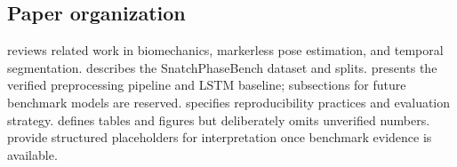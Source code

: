 \subsection{Paper organization}

 reviews related work in biomechanics, markerless pose estimation, and temporal segmentation.
 describes the SnatchPhaseBench dataset and splits.
 presents the verified preprocessing pipeline and \acs{LSTM} baseline; subsections for future benchmark models are reserved.
 specifies reproducibility practices and evaluation strategy.
 defines tables and figures but deliberately omits unverified numbers.
 provide structured placeholders for interpretation once benchmark evidence is available.
